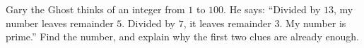 Gary the Ghost thinks of an integer from $1$ to $100$. He says: ``Divided by $13$, my number leaves remainder $5$. Divided by $7$, it leaves remainder $3$. My number is prime.'' Find the number, and explain why the first two clues are already enough.
